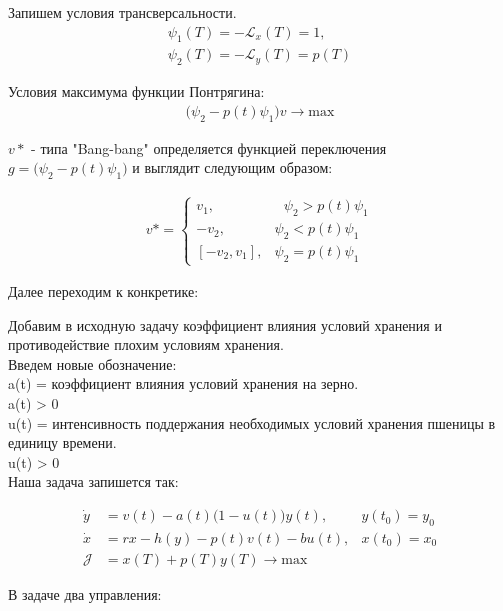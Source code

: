 Запишем  условия трансверсальности.
\begin{align}
    {\psi_{1}(T)} = \mathcal{- L}_x(T)= 1,\\
    {\psi_{2}(T)} = \mathcal {- L}_y(T)= p(T)
\end{align} 


Условия максимума функции Понтрягина:\\
\begin{align}
     \big (\psi_{2} - p(t)\psi_{1}\big )v \to \mathrm{max}
\end{align}


${v*}$ - типа "Bang-bang" определяется функцией переключения\\
$g = \big (\psi_{2} - p(t)\psi_{1} \big)$ и выглядит следующим образом:

\begin{align}
v* = 
 \begin{cases}
   v_{1}, &\text{ $\psi_{2} > p(t)\psi_{1}$}\\
   -v_{2}, &\text{$\psi_{2} < p(t)\psi_{1}$}\\
   [-v_{2},v_{1}], &\text{$\psi_{2} = p(t)\psi_{1}$}
 \end{cases}
\end{align}

Далее переходим к конкретике: 

Добавим в исходную задачу коэффициент влияния условий хранения и противодействие плохим условиям хранения.\\

Введем новые обозначение:\\
{a(t)} = коэффициент влияния условий хранения на зерно.\\
a(t) > 0\\
{u(t)} = интенсивность поддержания необходимых условий хранения пшеницы в единицу времени.\\
u(t) > 0\\

Наша задача запишется так:

\begin{align}
    \Dot{y} & = v(t) - a(t) \big (1 - u(t)\big ) y(t), & y(t_{0}) = y_{0} \\
    \Dot{x} & = r x - h(y) - p(t) v(t) - b u(t), & x(t_{0}) = x_{0} \\
    \mathcal{J} & = x(T) + p(T) y(T) \to \mathrm{max}
\end{align}

В задаче два управления:

